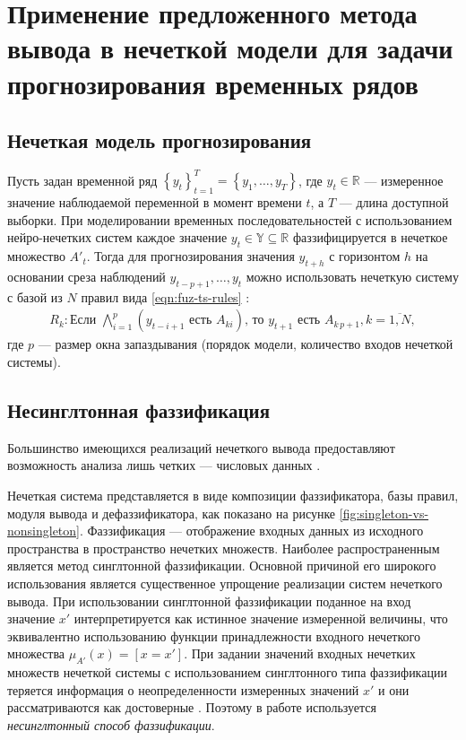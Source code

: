 \section{Применение предложенного метода вывода в нечеткой модели для задачи прогнозирования временных рядов}

\subsection{Нечеткая модель прогнозирования}

Пусть задан временной ряд $\left\{y_t\right\}_{t=1}^T = \left\{y_1, \dots, y_T\right\}$, где $y_t \in \mathbb{R}$ --- измеренное значение наблюдаемой переменной в момент времени $t$, а $T$ --- длина доступной выборки. При моделировании временных последовательностей с использованием нейро-нечетких систем каждое значение $y_t\in \mathbb{Y}\subseteq \mathbb{R}$ фаззифицируется в нечеткое множество $A'_t$. Тогда для прогнозирования значения $\hat{y}_{t+h}$ с горизонтом $h$ на основании среза наблюдений $y_{t-p+1}, \dots, y_t$ можно использовать нечеткую систему с базой из $N$ правил вида \eqref{eqn:fuz-ts-rules} \cite{OrlovEconometricsTS, PopovaTimeSeries2026, YarushevNeuroFuzzyTS}:
\begin{align}
	\label{eqn:fuz-ts-rules}
	R_k: \text{Если } \bigwedge_{i=1}^p \left(y_{t-i+1}\text{ есть }A_{ki}\right)\text{, то }y_{t+1}\textrm{ есть }A_{k\,p+1}, k=\overline{1,N},
\end{align}
где $p$ --- размер окна запаздывания (порядок модели, количество входов нечеткой системы).

\subsection{Несинглтонная фаззификация}

Большинство имеющихся реализаций нечеткого вывода предоставляют возможность анализа лишь четких --- числовых данных \cite{Mendel2017, Pourabdollah2015}.

Нечеткая система представляется в виде композиции фаззификатора, базы правил, модуля вывода и дефаззификатора, как показано на рисунке \cref{fig:singleton-vs-nonsingleton}. Фаззификация --- отображение входных данных из исходного пространства в пространство нечетких множеств. Наиболее распространенным является метод синглтонной фаззификации. Основной причиной его широкого использования является существенное упрощение реализации систем нечеткого вывода. При использовании синглтонной фаззификации поданное на вход значение $x'$ интерпретируется как истинное значение измеренной величины, что эквивалентно использованию функции принадлежности входного нечеткого множества $\mu_{A'}(x) = \left[x = x'\right]$. При задании значений входных нечетких множеств нечеткой системы с использованием синглтонного типа фаззификации теряется информация о неопределенности измеренных значений $x'$ и они рассматриваются как достоверные \cite{RyzhovFuzzySets, Mendel2017, Pourabdollah2015}. Поэтому в работе используется \textit{несинглтонный способ фаззификации}.

